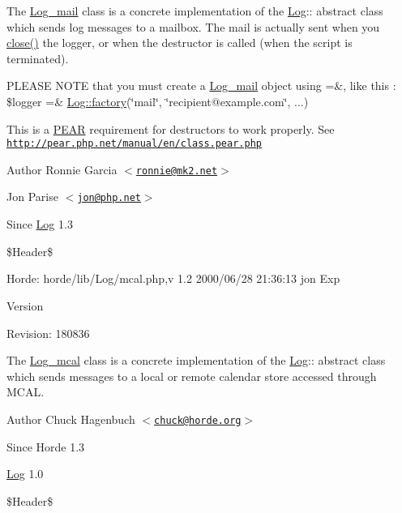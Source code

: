 The \hyperlink{class_log__mail}{Log\_\-mail} class is a concrete implementation of the \hyperlink{class_log}{Log}:: abstract class which sends log messages to a mailbox. The mail is actually sent when you \hyperlink{class_log_aa69c8bf1f1dcf4e72552efff1fe3e87e}{close()} the logger, or when the destructor is called (when the script is terminated).

PLEASE NOTE that you must create a \hyperlink{class_log__mail}{Log\_\-mail} object using =\&, like this : \$logger =\& \hyperlink{class_log_a6b64a01f123e8e670d5e9437db2b9e09}{Log::factory}(\char`\"{}mail\char`\"{}, \char`\"{}recipient@example.com\char`\"{}, ...)

This is a \hyperlink{namespace_p_e_a_r}{PEAR} requirement for destructors to work properly. See \href{http://pear.php.net/manual/en/class.pear.php}{\tt http://pear.php.net/manual/en/class.pear.php}

\begin{DoxyAuthor}{Author}
Ronnie Garcia $<$\href{mailto:ronnie@mk2.net}{\tt ronnie@mk2.net}$>$ 

Jon Parise $<$\href{mailto:jon@php.net}{\tt jon@php.net}$>$ 
\end{DoxyAuthor}
\begin{DoxySince}{Since}
\hyperlink{class_log}{Log} 1.3
\end{DoxySince}
\$Header\$ \begin{DoxyParagraph}{Horde:}
horde/lib/Log/mcal.php,v 1.2 2000/06/28 21:36:13 jon Exp 
\end{DoxyParagraph}


\begin{DoxyVersion}{Version}

\end{DoxyVersion}
\begin{DoxyParagraph}{Revision:}
180836 
\end{DoxyParagraph}


The \hyperlink{class_log__mcal}{Log\_\-mcal} class is a concrete implementation of the \hyperlink{class_log}{Log}:: abstract class which sends messages to a local or remote calendar store accessed through MCAL.

\begin{DoxyAuthor}{Author}
Chuck Hagenbuch $<$\href{mailto:chuck@horde.org}{\tt chuck@horde.org}$>$ 
\end{DoxyAuthor}
\begin{DoxySince}{Since}
Horde 1.3 

\hyperlink{class_log}{Log} 1.0
\end{DoxySince}
\$Header\$


